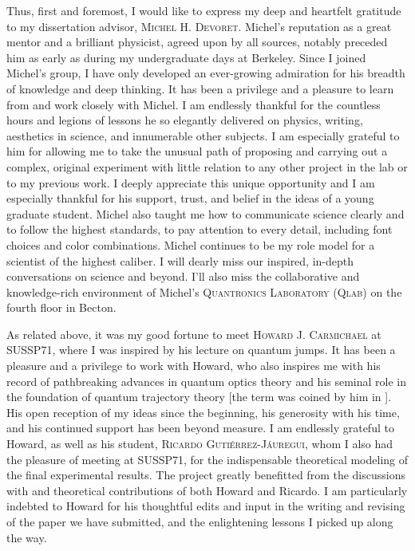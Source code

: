 Thus, first and foremost, I would like to express my deep and heartfelt gratitude to my dissertation advisor, \textsc{Michel H. Devoret}.  Michel’s reputation as a great mentor and a brilliant physicist, agreed upon by all sources, notably preceded him as early as during my undergraduate days at Berkeley. Since I joined Michel’s group, I have only developed an ever-growing admiration for his breadth of knowledge and deep thinking. It has been a privilege and a pleasure to learn from and work closely with Michel. I am endlessly thankful for the countless hours and legions of lessons he so elegantly delivered on physics, writing, aesthetics in science, and innumerable other subjects. I am especially grateful to him for allowing me to take the unusual path of proposing and carrying out a complex, original experiment with little relation to any other project in the lab or to my previous work. I deeply appreciate this unique opportunity and I am especially thankful for his support, trust, and belief in the ideas of a young graduate student.  Michel also taught me how to communicate science clearly and to follow the highest standards, to pay attention to every detail, including font choices and color combinations. Michel continues to be my role model for a scientist of the highest caliber. I will dearly miss our inspired, in-depth conversations on science and beyond. I’ll also miss the collaborative and knowledge-rich environment of Michel’s \textsc{Quantronics Laboratory (Qlab)} on the fourth floor in Becton.

As related above, it was my good fortune to meet \textsc{Howard J. Carmichael} at SUSSP71, where I was inspired by his lecture on quantum jumps. It has been a pleasure and a privilege to work with Howard, who also inspires me with his record of pathbreaking advances in quantum optics theory and his seminal role in the foundation of quantum trajectory theory [the term was coined by him in \cite{Carmichael1993}]. His open reception of my ideas since the beginning, his generosity with his time, and his continued support has been beyond measure. I am endlessly grateful to Howard, as well as his student, \textsc{Ricardo Gutiérrez-Jáuregui}, whom I also had the pleasure of meeting at SUSSP71, for the indispensable theoretical modeling of the final experimental results. The project greatly benefitted from the discussions with and theoretical contributions of both Howard and Ricardo. I am particularly indebted to Howard for his thoughtful edits and input in the writing and revising of the paper we have submitted, and the enlightening lessons I picked up along the way. 

